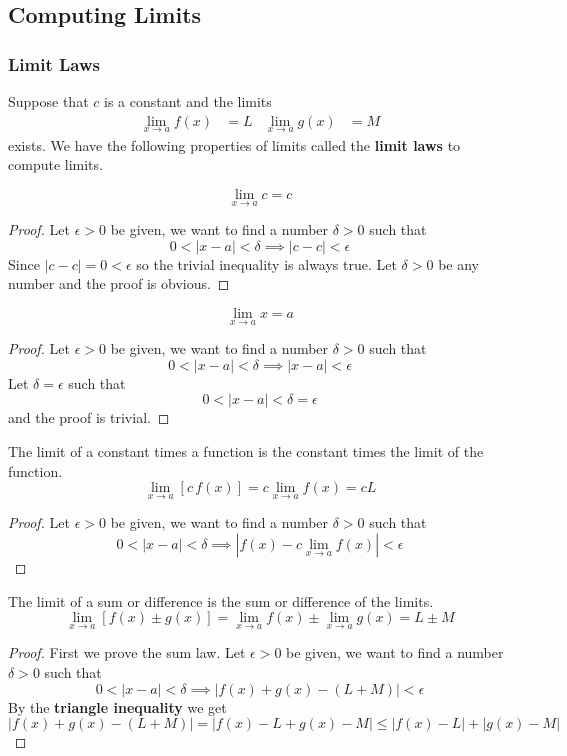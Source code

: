 \subsection{Computing Limits}

\subsubsection{Limit Laws}
Suppose that \(c\) is a constant and the limits
\begin{align*}
    \lim_{x\to a}f(x)&=L & \lim_{x\to a}g(x)&=M
\end{align*}
exists.
We have the following properties of limits called the \textbf{limit laws} to
compute limits.
\begin{theorem}
    \[\lim_{x\to a}c=c\]
\end{theorem}
\begin{proof}
    Let \(\epsilon>0\) be given, we want to find a number \(\delta>0\) such
    that \[0<|x-a|<\delta \implies |c-c|<\epsilon\]
    Since \(|c-c|=0<\epsilon\) so the trivial inequality is always true.
    Let \(\delta>0\) be any number and the proof is obvious.
\end{proof}
\begin{theorem}
    \[\lim_{x\to a}x=a\]
\end{theorem}
\begin{proof}
    Let \(\epsilon>0\) be given, we want to find a number \(\delta>0\) such
    that \[0<|x-a|<\delta \implies |x-a|<\epsilon\]
    Let \(\delta=\epsilon\) such that \[0<|x-a|<\delta=\epsilon\]
    and the proof is trivial.
\end{proof}
\begin{theorem}
    The limit of a constant times a function is the constant times the limit
    of the function.
    \[\lim_{x\to a}[c\,f(x)]=c\lim_{x\to a}f(x)=cL\]
\end{theorem}
\begin{proof}
    Let \(\epsilon>0\) be given, we want to find a number \(\delta>0\) such
    that \[0<|x-a|<\delta \implies |f(x)-c\lim_{x\to a}f(x)|<\epsilon\]
\end{proof}
\begin{theorem}
    The limit of a sum or difference is the sum or difference of the limits.
    \[\lim_{x\to a}[f(x)\pm g(x)]=\lim_{x\to a}f(x)\pm\lim_{x\to a}g(x)=L\pm M\]
\end{theorem}
\begin{proof}
    First we prove the sum law.
    Let \(\epsilon>0\) be given, we want to find a number \(\delta>0\) such
    that \[0<|x-a|<\delta \implies |f(x)+g(x)-(L+M)|<\epsilon\]
    By the \textbf{triangle inequality} we get
    \[|f(x)+g(x)-(L+M)| = |f(x)-L+g(x)-M| \leq |f(x)-L|+|g(x)-M|\]
\end{proof}
